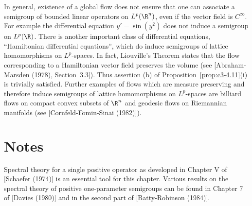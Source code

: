 In general, existence of a global flow does not ensure that one can
associate a semigroup of bounded linear operators on $L^p(\R ^n)$, even if
the vector field is $C^{\infty}$. For example the differential equation
$y' = \sin(y^2)$ does not induce a semigroup on $L^p(\R )$.
There is another important class of differential equations, \enquote{Hamiltonian differential equations}, which do induce semigroups of lattice homomorphisms on $L^p$-spaces. In fact, Liouville's Theorem states that the 
%
%
%
flow corresponding to a Hamiltonian vector field preserves the volume (see [Abraham-Marsden (1978), Section~3.3]). Thus assertion (b) of Proposition~\ref{prop:c3-4.11}(i) is trivially satisfied.
Further examples of flows which are measure preserving and therefore induce semigroups of lattice homomorphisms on $L^p$-spaces are billiard flows on compact convex subsets of $\R ^n$ and geodesic flows on Riemannian manifolds (see [Cornfeld-Fomin-Sinai (1982)]).



\clearpage
\section*{Notes}

Spectral theory for a single positive operator as developed in Chapter V of [Schaefer (1974)] is an essential tool for this chapter. 
Various results on the spectral theory of positive one-parameter semigroups can be found in Chapter 7 of [Davies (1980)] and in the second part of [Batty-Robinson (1984)].

